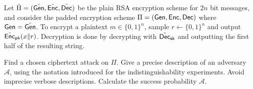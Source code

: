 \documentclass[a4paper,10pt,landscape,twocolumn]{scrartcl}
\begin{document}
\begin{exercise}
	Let $\tilde \Pi=(\tilde{\mathsf{Gen}}, \tilde {\mathsf{Enc}}, \tilde {\mathsf{Dec}})$ be the plain RSA encryption scheme for $2 n$ bit messages, and consider the
	padded encryption scheme $\Pi=(\mathsf{Gen}, \mathsf{Enc}, \mathsf{Dec})$ where $\mathsf{Gen}=\tilde{\mathsf{Gen}}$. To encrypt a plaintext $m\in\{0,1\}^n$, sample $r\gets\{0,1\}^n$ and output $\tilde {\mathsf{Enc}}_{\mathsf{pk}}(x\|r)$. Decryption is done by decrypting with $\tilde{\mathsf{Dec}}_{\mathsf{sk}}$ and outputting the first half of the resulting string.
	\begin{subex}
		Find a chosen ciphertext attack on $\Pi$. Give a precise description of an adversary $\mathcal A$, using the notation introduced for the indistinguishability experiments. Avoid imprecise verbose descriptions. Calculate the success probability $\mathcal A$.
	\end{subex}
\end{exercise}
\end{document}
